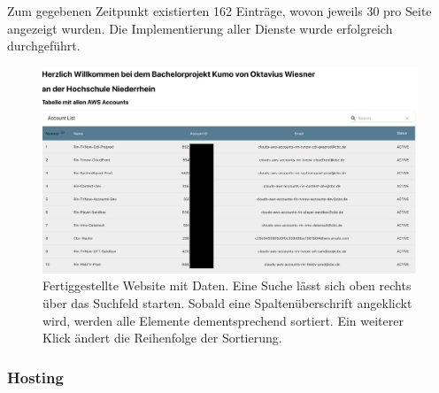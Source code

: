  Zum gegebenen Zeitpunkt existierten 162 Einträge, wovon jeweils 30 pro Seite angezeigt wurden.
 Die Implementierung aller Dienste wurde erfolgreich durchgeführt.
\clearpage
 \begin{figure}[htbp]
    \centering
    \includegraphics[width=1.0\textwidth]{50-Implementierung/Webanwendung.png}
    \caption{Fertiggestellte Website mit Daten. Eine Suche lässt sich oben rechts über das Suchfeld starten. Sobald eine Spaltenüberschrift angeklickt wird, werden alle Elemente dementsprechend sortiert. Ein weiterer Klick ändert die Reihenfolge der Sortierung.  }
    \label{fig:FertigSeite}
\end{figure}

\subsubsection{Hosting}

